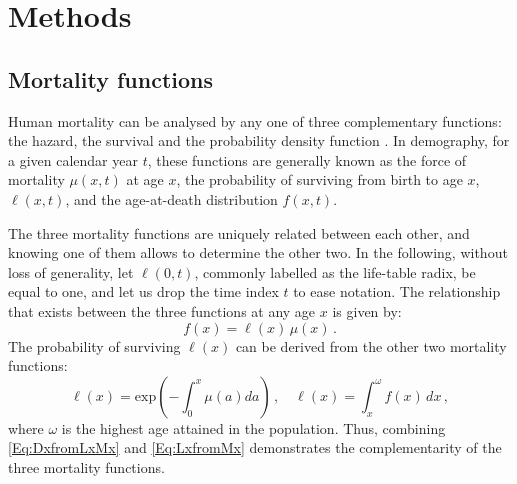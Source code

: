 \documentclass[11pt, a4paper]{article}
\begin{document}
\section{Methods}\label{Sec:Methods}

\subsection{Mortality functions}\label{Subsec:MortFun}

Human mortality can be analysed by any one of three complementary functions: the hazard, the survival and the probability density function \citep{klein2005survival}. In demography, for a given calendar year $t$, these functions are generally known as the force of mortality $\mu(x,t)$ at age $x$, the probability of surviving from birth to age $x$, $\ell(x,t)$, and the age-at-death distribution $f(x,t)$. 

The three mortality functions are uniquely related between each other, and knowing one of them allows to determine the other two. In the following, without loss of generality, let $\ell(0, t)$, commonly labelled as the life-table radix, be equal to one, and let us drop the time index $t$ to ease notation. The relationship that exists between the three functions at any age $x$ is given by:
%
\begin{equation}\label{Eq:DxfromLxMx}
f(x)  = \ell(x)\,\mu(x)\,.
\end{equation}
%
The probability of surviving  $\ell(x)$ can be derived from the other two mortality functions:
%
\begin{equation}\label{Eq:LxfromMx}
\ell(x) = \mathrm{exp} \left(- \int_{0}^{x} \mu (a)da\right)\,, \quad \ell(x) = \int_{x}^{\omega} f(x)\,dx\,,
\end{equation}
%
where $\omega$ is the highest age attained in the population. Thus, combining \eqref{Eq:DxfromLxMx} and \eqref{Eq:LxfromMx} demonstrates the complementarity of the three mortality functions.
\end{document}
